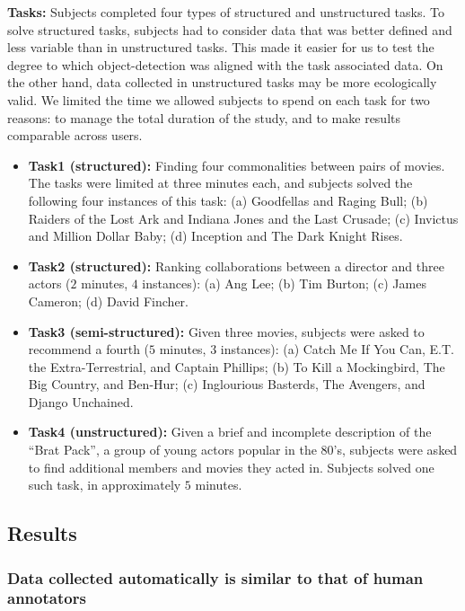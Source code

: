 \noindent\textbf{Tasks:} Subjects completed four types of structured and unstructured tasks. To solve structured tasks, subjects had to consider data that was better defined and less variable than in unstructured tasks. This made it easier for us to test the degree to which object-detection was aligned with the task associated data. On the other hand, data collected in unstructured tasks may be more ecologically valid. We limited the time we allowed subjects to spend on each task for two reasons: to manage the total duration of the study, and to make results comparable across users.

\begin{itemize}
\item \textbf{Task1 (structured):} Finding four commonalities between pairs of movies. The tasks were limited at three minutes each, and subjects solved the following four instances of this task: (a) Goodfellas and Raging Bull; (b) Raiders of the Lost Ark and Indiana Jones and the Last Crusade; (c) Invictus and Million Dollar Baby; (d) Inception and The Dark Knight Rises.  
\item \textbf{Task2 (structured):} Ranking collaborations between a director and three actors ($2$ minutes, $4$ instances): (a) Ang Lee; (b) Tim Burton; (c) James Cameron; (d) David Fincher.  
\item \textbf{Task3 (semi-structured):} Given three movies, subjects were asked to recommend a fourth ($5$ minutes, $3$ instances): (a) Catch Me If You Can, E.T. the Extra-Terrestrial, and Captain Phillips; (b) To Kill a Mockingbird, The Big Country, and Ben-Hur; (c) Inglourious Basterds, The Avengers, and Django Unchained.

\item \textbf{Task4 (unstructured):} Given a brief and incomplete description of the ``Brat Pack'', a group of young actors popular in the 80's, subjects were asked to find additional members and movies they acted in. Subjects solved one such task, in approximately $5$ minutes. 
\end{itemize}


\subsection{Results}
\subsubsection{Data collected automatically is similar to that of human annotators}
\label{sec:EvalResults}


